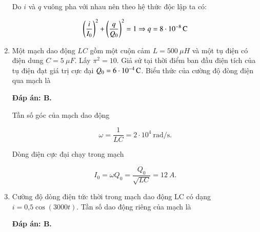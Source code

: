 \begin{enumerate}[label=\bfseries Câu \arabic*:]
{		Do $i$ và $q$ vuông pha với nhau nên theo hệ thức độc lập ta có:
		
		$$\left(\dfrac{i}{I_0}\right)^2 +\left(\dfrac{q}{Q_0}\right)^2 =1 \Rightarrow q = \xsi{8 \cdot 10^{-8}}{C} $$
		
		
		
	}
		\item {} 
	
	{Một mạch dao động $LC$ gồm một cuộn cảm $L=\SI{500}{\mu H}$ và một tụ điện có điện dung $C = \SI{5}{\mu F}$. Lấy $\pi^2 = 10$. Giả sử tại thời điểm ban đầu điện tích của tụ điện đạt giá trị cực đại $Q_0 = \xsi{6 \cdot 10^{-4}}{C}$. Biểu thức của cường độ đòng điện qua mạch là
		
		
	}
	\hideall
	{		\textbf{Đáp án: B.}
		
		Tần số góc của mạch dao động 
		
		$$\omega = \dfrac{1}{LC} = 2\cdot 10^4\ \text{rad/s}.$$
		
		Dòng điện cực đại chạy trong mạch
		
		$$I_0 = \omega Q_0 = \dfrac{Q_0}{\sqrt{LC}} = \SI{12}{A}.$$
		
		
		
		
		
	}
	\item {}
	
	{Cường độ dòng điện tức thời trong mạch dao động LC có dạng $i = \text{0,5} \cos \left( 3000t \right)$. Tần số dao động riêng của mạch là  
	}
	
	\hideall
	{		\textbf{Đáp án: B.}
		
}
\end{enumerate}
